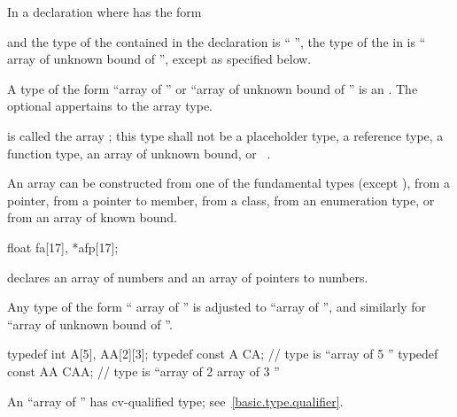 \pnum
In a declaration   where  has the form
\begin{ncsimplebnf}
 
\end{ncsimplebnf}
and the type of the contained 
in the declaration  
is `` '',
the type of the  in  is
`` array of unknown bound of '', except as specified below.

\pnum
{}%
A type of the form ``array of  '' or
``array of unknown bound of '' is an .
The optional 
appertains to the array type.

\pnum
{} is called the array ;
this type shall not be
a placeholder type,
a reference type,
a function type,
an array of unknown bound, or
\cv{}~.
\begin{note}
An array can be constructed
from one of the fundamental types (except ),
from a pointer,
from a pointer to member,
from a class,
from an enumeration type,
or from an array of known bound.
\end{note}
\begin{example}
\begin{codeblock}
float fa[17], *afp[17];
\end{codeblock}
declares an array of  numbers and
an array of pointers to  numbers.
\end{example}

\pnum
Any type of the form
`` array of  ''
is adjusted to
``array of   '',
and similarly for ``array of unknown bound of ''.
\begin{example}
\begin{codeblock}
typedef int A[5], AA[2][3];
typedef const A CA;             // type is ``array of 5 ''
typedef const AA CAA;           // type is ``array of 2 array of 3 ''
\end{codeblock}
\end{example}
\begin{note}
An ``array of   ''
has cv-qualified type; see~\ref{basic.type.qualifier}.
\end{note}

